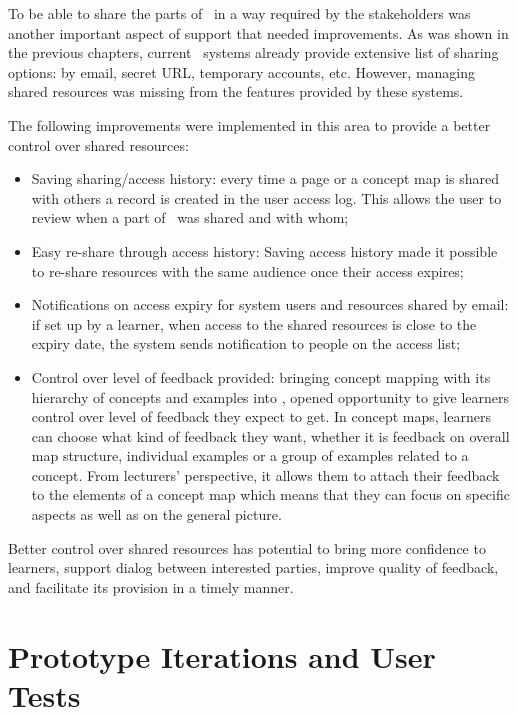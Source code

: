 To be able to share the parts of \ep~in a way required by the stakeholders was
another important aspect of \LLLs support that needed improvements. As was shown
in the previous chapters, current \ep~systems already provide extensive list of
sharing options: by email, secret URL, temporary accounts, etc. However,
managing shared resources was missing from the features provided by these systems.

The following improvements were implemented in this area to provide a better
control over shared resources:

\begin{itemize}
  \item Saving sharing/access history: every time a page or a concept map is
  shared with others a record is created in the user access log. This allows the
  user to review when a part of \ep~was shared and with whom; 
  \item Easy re-share through access history: Saving access history made it
  possible to re-share resources with the same audience once their access
  expires;
  \item Notifications on access expiry for system users and resources shared by
  email: if set up by a learner, when access to the shared resources is close to
  the expiry date, the system sends notification to people on the access list;
  \item Control over level of feedback provided: bringing concept mapping with
  its hierarchy of concepts and examples into \ep, opened opportunity to give
  learners control over level of feedback they expect to get. In concept maps,
  learners can choose what kind of feedback they want, whether it is feedback on
  overall map structure, individual examples or a group of examples related to a
  concept. From lecturers' perspective, it allows them to attach their feedback
  to the elements of a concept map which means that they can focus on specific
  aspects as well as on the general picture.
\end{itemize}

Better control over shared resources has potential to bring more confidence to
learners, support dialog between interested parties, improve quality of
feedback, and facilitate its provision in a timely manner.

\section{Prototype Iterations and User Tests}
 
